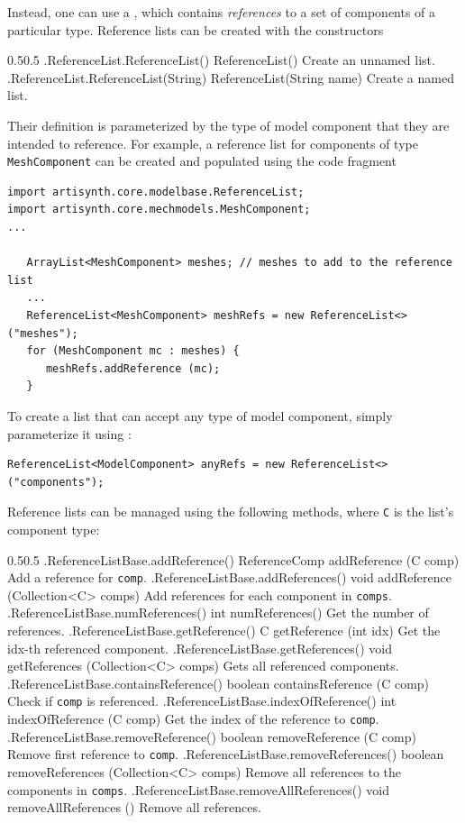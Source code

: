 Instead, one can use a
, which contains
{\it references} to a set of components of a particular type.  Reference lists
can be created with the constructors
%
\begin{methodtable}{0.5}{0.5}
\midline
%
\methodentry
{\mbase.ReferenceList.ReferenceList()}%
{ReferenceList()}%
{Create an unnamed list.}%
%
\methodentry
{\mbase.ReferenceList.ReferenceList(String)}%
{ReferenceList(String name)}%
{Create a named list.}%
%
\midline
\end{methodtable}
%
Their definition is parameterized by the type of model component that they are
intended to reference. For example, a reference list for components of type
{\tt MeshComponent} can be created and populated using the code fragment
%
\begin{lstlisting}[]
import artisynth.core.modelbase.ReferenceList;
import artisynth.core.mechmodels.MeshComponent;
...

   ArrayList<MeshComponent> meshes; // meshes to add to the reference list
   ...
   ReferenceList<MeshComponent> meshRefs = new ReferenceList<> ("meshes");
   for (MeshComponent mc : meshes) {
      meshRefs.addReference (mc);
   }
\end{lstlisting}
%
To create a list that can accept any type of model component, simply
parameterize it using 
:
%
\begin{lstlisting}[]
   ReferenceList<ModelComponent> anyRefs = new ReferenceList<> ("components");
\end{lstlisting}
%
Reference lists can be managed using the following methods, where {\tt C} is
the list's component type:
%
\begin{methodtable}{0.5}{0.5}
\midline
%
\methodentry
{\mbase.ReferenceListBase.addReference()}%
{ReferenceComp addReference (C comp)}%
{Add a reference for {\tt comp}.}%
%
\methodentry
{\mbase.ReferenceListBase.addReferences()}%
{void addReference (Collection<C> comps)}%
{Add references for each component in {\tt comps}.}%
%
\methodspace{0.5em}%
\methodentry
{\mbase.ReferenceListBase.numReferences()}%
{int numReferences()}%
{Get the number of references.}%
%
\methodentry
{\mbase.ReferenceListBase.getReference()}%
{C getReference (int idx)}%
{Get the idx-th referenced component.}%
%
\methodentry
{\mbase.ReferenceListBase.getReferences()}%
{void getReferences (Collection<C> comps)}%
{Gets all referenced components.}%
%
\methodentry
{\mbase.ReferenceListBase.containsReference()}%
{boolean containsReference (C comp)}%
{Check if {\tt comp} is referenced.}%
%
\methodentry
{\mbase.ReferenceListBase.indexOfReference()}%
{int indexOfReference (C comp)}%
{Get the index of the reference to {\tt comp}.}%
%
\methodspace{0.5em}%
\methodentry
{\mbase.ReferenceListBase.removeReference()}%
{boolean removeReference (C comp)}%
{Remove first reference to {\tt comp}.}%
%
\methodentry
{\mbase.ReferenceListBase.removeReferences()}%
{boolean removeReferences (Collection<C> comps)}%
{Remove all references to the components in {\tt comps}.}%
%
\methodentry
{\mbase.ReferenceListBase.removeAllReferences()}%
{void removeAllReferences ()}%
{Remove all references.}%
%
\midline
\end{methodtable}

